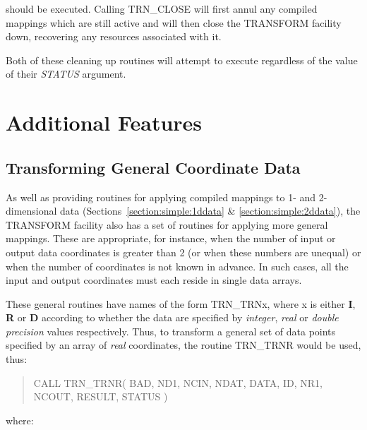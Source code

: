 \documentclass[twoside,nolof,11pt]{starlink}
\providecommand{\name}[1]{\small{#1}}
\providecommand{\fortvar}[1]{\emph{#1}}
\begin{document}
should be executed.
Calling \name{TRN\_CLOSE} will first annul any compiled mappings which are
still active and will then close the \name{TRANSFORM} facility down,
recovering any resources associated with it.

Both of these cleaning up routines will attempt to execute regardless of the
value of their \fortvar{STATUS} argument.


\section{Additional Features}

\subsection{Transforming General Coordinate Data}

\label{section:additional:generaldata}

As well as providing routines for applying compiled mappings to 1- and
2-dimensional data (Sections~\ref{section:simple:1ddata} \&
\ref{section:simple:2ddata}), the \name{TRANSFORM} facility also has a set
of routines for applying more general mappings.
These are appropriate, for instance, when the number of input or output data
coordinates is greater than 2 (or when these numbers are unequal) or when
the number of coordinates is not known in advance.
In such cases, all the input and output coordinates must each reside in
single data arrays.

These general routines have names of the form \name{TRN\_TRNx}, where x is
either \textbf{I}, \textbf{R} or \textbf{D} according to whether the data are
specified by \emph{integer}, \emph{real} or \emph{double precision} values
respectively.
Thus, to transform a general set of data points specified by an array of
\emph{real} coordinates, the routine \name{TRN\_TRNR} would be used, thus:

\begin{quote}\small
\begin{terminalv}
CALL TRN_TRNR( BAD, ND1, NCIN, NDAT, DATA, ID, NR1, NCOUT, RESULT, STATUS )
\end{terminalv}
\end{quote}

where:
\end{document}
